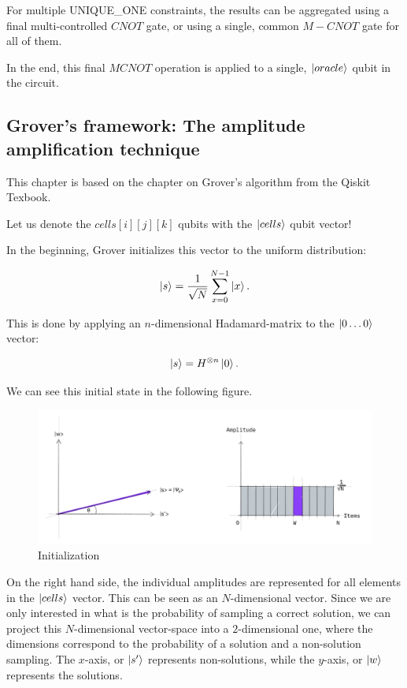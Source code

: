 For multiple UNIQUE\_ONE constraints, the results can be aggregated using a final multi-controlled $CNOT$ gate, or using a single, common $M-CNOT$ gate for all of them.

In the end, this final $MCNOT$ operation is applied to a single, $\ket{oracle}$ qubit in the circuit.

\subsection{Grover's framework: The amplitude amplification technique}

This chapter is based on the chapter on Grover's algorithm from the Qiskit Texbook\cite{GroverQiskitTextbook}.

Let us denote the $cells[i][j][k]$ qubits with the $\ket{cells}$ qubit vector!

In the beginning, Grover initializes this vector to the uniform distribution:

\begin{align*}
\ket{s} = \frac{1}{\sqrt{N}}\sum\limits_{x=0}^{N-1}\ket{x}.
\end{align*}

This is done by applying an $n$-dimensional Hadamard-matrix to the $\ket{0\dots{}0}$ vector:

\begin{align*}
\ket{s} = H^{\otimes{}n}\ket{0}.
\end{align*}

We can see this initial state in the following figure.

\begin{figure}[H]
  \centering
    \includegraphics[width=\linewidth]{content/assets/03_grovers_algorithm/grover_step1.jpg}
    \caption{Initialization\cite{GroverQiskitTextbook}}
\end{figure}

On the right hand side, the individual amplitudes are represented for all elements in the $\ket{cells}$ vector. This can be seen as an $N$-dimensional vector. Since we are only interested in what is the probability of sampling a correct solution, we can project this $N$-dimensional vector-space into a $2$-dimensional one, where the dimensions correspond to the probability of a solution and a non-solution sampling. The $x$-axis, or $\ket{s'}$ represents non-solutions, while the $y$-axis, or $\ket{w}$ represents the solutions.

